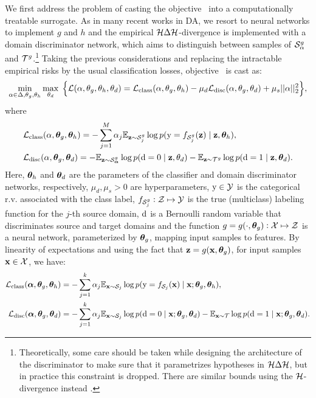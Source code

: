 We first address the problem of casting the objective~ into a computationally treatable surrogate. As in many recent works in DA, we resort to neural networks to implement $g$ and $h$ and the empirical ${\mathcal{H}} \Delta {\mathcal{H}}$-divergence is implemented with a domain discriminator network, which aims to distinguish between samples of ${\mathcal{S}}_\alpha^g$ and ${\mathcal{T}}^g$.\footnote[1]{Theoretically, some care should be taken while designing the architecture of the discriminator to make sure that it parametrizes hypotheses in ${\mathcal{H}} \Delta {\mathcal{H}}$, but in practice this constraint is dropped. There are similar bounds using the ${\mathcal{H}}$-divergence instead \citep{Sebag2019}.} Taking the previous considerations and replacing the intractable empirical risks by the usual classification losses, objective~ is cast as:
\begin{equation}
\min_{\alpha \in \Delta, \theta_g, \theta_h} \max_{\theta_d} \; \Big\{ {\mathcal{L}}(\alpha, \theta_g, \theta_h, \theta_d) = {\mathcal{L}}_\text{class}(\alpha, \theta_g, \theta_h) - \mu_d {\mathcal{L}}_\text{disc}(\alpha, \theta_g, \theta_d) + \mu_s ||\alpha||_2^2 \Big\},
\end{equation}
where
\begin{align}
&\gL_\text{class}(\alpha, \vtheta_g, \vtheta_h) = -\sum_{j=1}^M \alpha_j\E_{\rvz \sim \gS_j^g}\log p(\ry=f_{\gS_j^g}(\rvz) \mid \rvz, \vtheta_h), \\
%
&\gL_\text{disc}(\alpha, \vtheta_g, \vtheta_d) = -\E_{\rvz \sim \gS_{\valpha}^g} \log p(\rd=0 \mid \rvz, \theta_d) - \E_{\rvz \sim \gT^g} \log p(\rd=1 \mid \rvz, \vtheta_d).
\end{align}
Here, ${\bm{\theta}}_h$ and ${\bm{\theta}}_d$ are the parameters of the classifier and domain discriminator networks, respectively, $\mu_d, \mu_s > 0$ are hyperparameters, ${\textnormal{y}} \in {\mathcal{Y}}$ is the categorical r.v. associated with the class label, $f_{{\mathcal{S}}_j^g}: {\mathcal{Z}} \mapsto {\mathcal{Y}}$ is the true (multiclass) labeling function for the $j$-th source domain, ${\textnormal{d}}$ is a Bernoulli random variable that discriminates source and target domains and the function $g = g(\cdot, {\bm{\theta}}_g): {\mathcal{X}} \mapsto {\mathcal{Z}}$ is a neural network, parameterized by ${\bm{\theta}}_g$, mapping input samples to features. By linearity of expectations and using the fact that ${\mathbf{z}} = g({\mathbf{x}}, {\bm{\theta}}_g)$, for input samples ${\mathbf{x}} \in {\mathcal{X}}$, we have:
\begin{align}
\label{eq:loss_class}
\gL_\text{class}(\valpha, \vtheta_g, \vtheta_h) &= -\sum_{j=1}^k \alpha_j\E_{\rvx \sim \gS_j} \log p(\ry=f_{\gS_j}(\rvx) \mid \rvx; \vtheta_g, \vtheta_h), \\
\allowdisplaybreaks
\label{eq:loss_disc}
\gL_\text{disc}(\valpha, \vtheta_g, \vtheta_d) &= -\sum_{j=1}^k \alpha_j\E_{\rvx \sim \gS_j} \log p(\rd=0 \mid \rvx; \vtheta_g, \vtheta_d)  - \E_{\rvx \sim \gT} \log p(\rd=1 \mid \rvx; \vtheta_g, \vtheta_d) .
\end{align}
